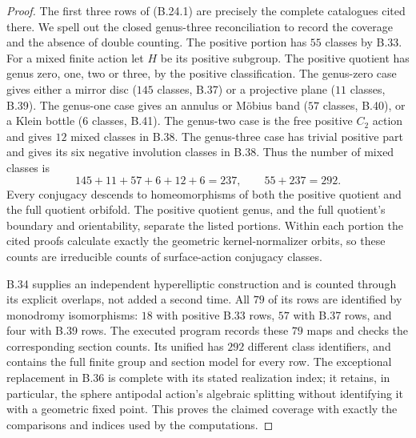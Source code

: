 \begin{proof}
The first three rows of (B.24.1) are precisely the complete catalogues
cited there.  We spell out the closed genus-three reconciliation to
record the coverage and the absence of double counting.
The positive portion has $55$ classes by B.33.  For a mixed finite
action let $H$ be its positive subgroup.  The positive quotient has
genus zero, one, two or three, by the positive classification.
The genus-zero case gives either a mirror disc ($145$ classes,
B.37) or a projective plane ($11$ classes, B.39).  The genus-one case
gives an annulus or M\"obius band ($57$ classes, B.40), or a Klein
bottle ($6$ classes, B.41).  The genus-two case is the free positive
$C_2$ action and gives $12$ mixed classes in B.38.  The genus-three
case has trivial positive part and gives its six negative involution
classes in B.38.  Thus the number of mixed classes is
\[
                   145+11+57+6+12+6=237,
                     \qquad55+237=292.                \tag{B.24.2}
\]
Every conjugacy descends to homeomorphisms of both the positive
quotient and the full quotient orbifold.  The positive quotient genus,
and the full quotient's boundary and orientability, separate the
listed portions.  Within each portion the cited proofs calculate
exactly the geometric kernel-normalizer orbits, so these counts are
irreducible counts of surface-action conjugacy classes.

B.34 supplies an independent hyperelliptic construction and is
counted through its explicit overlaps, not added a second time.
All $79$ of its rows are identified by monodromy isomorphisms:
$18$ with positive B.33 rows, $57$ with B.37 rows, and four with B.39
rows.  The executed program
 records these $79$ maps and
checks the corresponding section counts.  Its unified
 has $292$ different
class identifiers, and 
contains the full finite group and section model for every row.
The exceptional replacement in B.36 is complete with its stated
realization index; it retains, in particular, the sphere antipodal
action's algebraic splitting without identifying it with a geometric
fixed point.  This proves the claimed coverage with exactly the
comparisons and indices used by the computations.
\end{proof}
